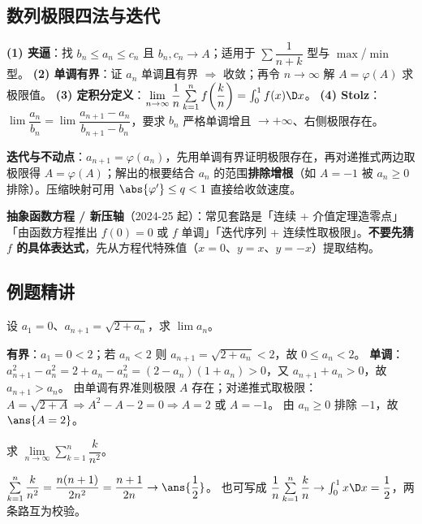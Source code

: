 \documentclass[11pt,a4paper]{ctexart}
\begin{document}
\subsection{数列极限四法与迭代}

\begin{keypoint}[四种武器]
\textbf{(1) 夹逼}：找 $b_n\le a_n\le c_n$ 且 $b_n,c_n\to A$；适用于 $\sum\dfrac{1}{n+k}$ 型与 $\max$/$\min$ 型。
\textbf{(2) 单调有界}：证 $a_n$ 单调\textbf{且}有界 $\Rightarrow$ 收敛；再令 $n\to\infty$ 解 $A=\varphi(A)$ 求极限值。
\textbf{(3) 定积分定义}：$\lim\limits_{n\to\infty}\dfrac1n\sum\limits_{k=1}^n f\!\left(\dfrac kn\right)=\int_0^1 f(x)\D x$。
\textbf{(4) Stolz}：$\lim\dfrac{a_n}{b_n}=\lim\dfrac{a_{n+1}-a_n}{b_{n+1}-b_n}$，要求 $b_n$ 严格单调增且 $\to+\infty$、右侧极限存在。
\end{keypoint}

\noindent\textbf{迭代与不动点}：$a_{n+1}=\varphi(a_n)$，先用单调有界证明极限存在，再对递推式两边取极限得 $A=\varphi(A)$；解出的根要结合 $a_n$ 的范围\textbf{排除增根}（如 $A=-1$ 被 $a_n\ge0$ 排除）。压缩映射可用 $\abs{\varphi'}\le q<1$ 直接给收敛速度。

\noindent\textbf{抽象函数方程 / 新压轴}（2024-25 起）：常见套路是「连续 + 介值定理造零点」「由函数方程推出 $f(0)=0$ 或 $f$ 单调」「迭代序列 + 连续性取极限」。\textbf{不要先猜 $f$ 的具体表达式}，先从方程代特殊值（$x=0$、$y=x$、$y=-x$）提取结构。

\subsection{例题精讲}

\begin{exa}[迭代：两件事都要证]
设 $a_1=0$、$a_{n+1}=\sqrt{2+a_n}$，求 $\lim a_n$。
\end{exa}
\begin{solution}
\textbf{有界}：$a_1=0<2$；若 $a_n<2$ 则 $a_{n+1}=\sqrt{2+a_n}<2$，故 $0\le a_n<2$。
\textbf{单调}：$a_{n+1}^2-a_n^2=2+a_n-a_n^2=(2-a_n)(1+a_n)>0$，又 $a_{n+1}+a_n>0$，故 $a_{n+1}>a_n$。
由单调有界准则极限 $A$ 存在；对递推式取极限：$A=\sqrt{2+A}\Rightarrow A^2-A-2=0\Rightarrow A=2$ 或 $A=-1$。
由 $a_n\ge0$ 排除 $-1$，故 $\ans{A=2}$。
\end{solution}

\begin{exa}[定积分定义 / 求和]
求 $\lim\limits_{n\to\infty}\sum\limits_{k=1}^n\dfrac{k}{n^2}$。
\end{exa}
\begin{solution}
$\sum\limits_{k=1}^n\dfrac{k}{n^2}=\dfrac{n(n+1)}{2n^2}=\dfrac{n+1}{2n}\to\ans{\dfrac12}$。
也可写成 $\dfrac1n\sum\limits_{k=1}^n\dfrac kn\to\int_0^1 x\D x=\dfrac12$，两条路互为校验。
\end{solution}
\end{document}
